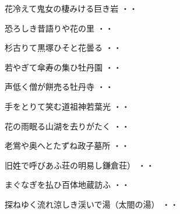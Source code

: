 \vspace{0.6cm}
\begin{shiika}花冷えて鬼女の棲みける巨き岩
\hfill{・・}\end{shiika}
\vspace{0.6cm}
\begin{shiika}恐ろしき昔語りや花の里
\hfill{・・}\end{shiika}
\vspace{0.6cm}
\begin{shiika}杉古りて黒塚ひそと花曇る
\hfill{・・}\end{shiika}
\vspace{0.6cm}
\begin{shiika}若やぎて傘寿の集ひ牡丹園
\hfill{・・}\end{shiika}
\vspace{0.6cm}
\begin{shiika}声低く僧が餅売る牡丹寺
\hfill{・・}\end{shiika}
\vspace{0.6cm}
\begin{shiika}手をとりて笑む道祖神若葉光
\hfill{・・}\end{shiika}
\vspace{0.6cm}
\begin{shiika}花の雨眠る山湖を去りがたく
\hfill{・・}\end{shiika}
\vspace{0.6cm}
\begin{shiika}老鴬や奥へとたずね政子墓所
\hfill{・・}\end{shiika}
\vspace{0.6cm}
\begin{shiika}旧姓で呼びあふ荘の明易し鎌倉荘）
\hfill{・・}\end{shiika}
\vspace{0.6cm}
\begin{shiika}まぐなぎを払ひ百体地蔵訪ふ
\hfill{・・}\end{shiika}
\vspace{0.6cm}
\begin{shiika}探ねゆく流れ涼しき渓いで湯（太閤の湯）
\hfill{・・}\end{shiika}
